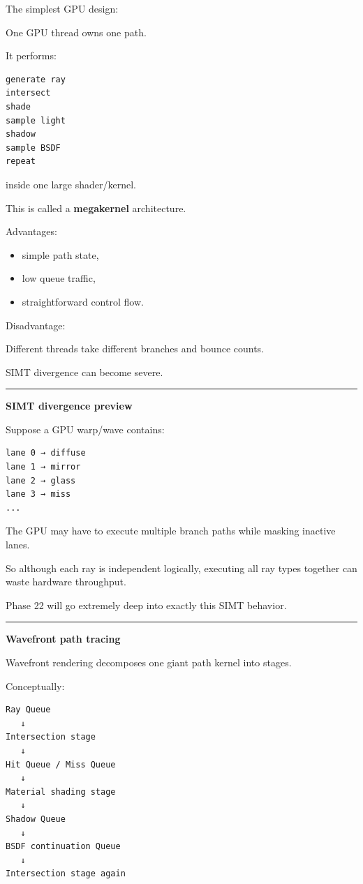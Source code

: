 The simplest GPU design:

One GPU thread owns one path.

It performs:

\begin{verbatim}
generate ray
intersect
shade
sample light
shadow
sample BSDF
repeat
\end{verbatim}

inside one large shader/kernel.

This is called a \textbf{megakernel} architecture.

Advantages:

\begin{itemize}
\tightlist
\item
  simple path state,
\item
  low queue traffic,
\item
  straightforward control flow.
\end{itemize}

Disadvantage:

Different threads take different branches and bounce counts.

SIMT divergence can become severe.

\begin{center}\rule{0.5\linewidth}{0.5pt}\end{center}

\textbf{SIMT divergence preview}

Suppose a GPU warp/wave contains:

\begin{verbatim}
lane 0 → diffuse
lane 1 → mirror
lane 2 → glass
lane 3 → miss
...
\end{verbatim}

The GPU may have to execute multiple branch paths while masking inactive lanes.

So although each ray is independent logically, executing all ray types together can waste hardware throughput.

Phase 22 will go extremely deep into exactly this SIMT behavior.

\begin{center}\rule{0.5\linewidth}{0.5pt}\end{center}

\textbf{Wavefront path tracing}

Wavefront rendering decomposes one giant path kernel into stages.

Conceptually:

\begin{verbatim}
Ray Queue
   ↓
Intersection stage
   ↓
Hit Queue / Miss Queue
   ↓
Material shading stage
   ↓
Shadow Queue
   ↓
BSDF continuation Queue
   ↓
Intersection stage again
\end{verbatim}

